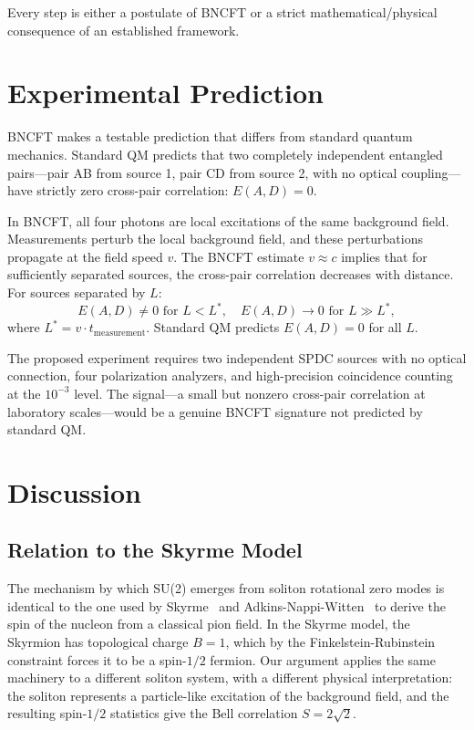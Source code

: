 \documentclass[11pt,a4paper]{article}
\begin{document}
Every step is either a postulate of BNCFT or a strict mathematical/physical consequence of an established framework.

\section{Experimental Prediction}

BNCFT makes a testable prediction that differs from standard quantum mechanics. Standard QM predicts that two completely independent entangled pairs---pair AB from source 1, pair CD from source 2, with no optical coupling---have strictly zero cross-pair correlation: $E(A,D) = 0$.

In BNCFT, all four photons are local excitations of the same background field. Measurements perturb the local background field, and these perturbations propagate at the field speed $v$. The BNCFT estimate $v \approx c$ implies that for sufficiently separated sources, the cross-pair correlation decreases with distance. For sources separated by $L$:
\begin{equation}
E(A,D) \neq 0 \text{ for } L < L^*, \quad E(A,D) \to 0 \text{ for } L \gg L^*,
\end{equation}
where $L^* = v \cdot t_{\text{measurement}}$. Standard QM predicts $E(A,D) = 0$ for all $L$.

The proposed experiment requires two independent SPDC sources with no optical connection, four polarization analyzers, and high-precision coincidence counting at the $10^{-3}$ level. The signal---a small but nonzero cross-pair correlation at laboratory scales---would be a genuine BNCFT signature not predicted by standard QM.

\section{Discussion}

\subsection{Relation to the Skyrme Model}

The mechanism by which SU(2) emerges from soliton rotational zero modes is identical to the one used by Skyrme~\cite{skyrme1962} and Adkins-Nappi-Witten~\cite{anw1983} to derive the spin of the nucleon from a classical pion field. In the Skyrme model, the Skyrmion has topological charge $B = 1$, which by the Finkelstein-Rubinstein constraint forces it to be a spin-$1/2$ fermion. Our argument applies the same machinery to a different soliton system, with a different physical interpretation: the soliton represents a particle-like excitation of the background field, and the resulting spin-$1/2$ statistics give the Bell correlation $S = 2\sqrt{2}$.
\end{document}
